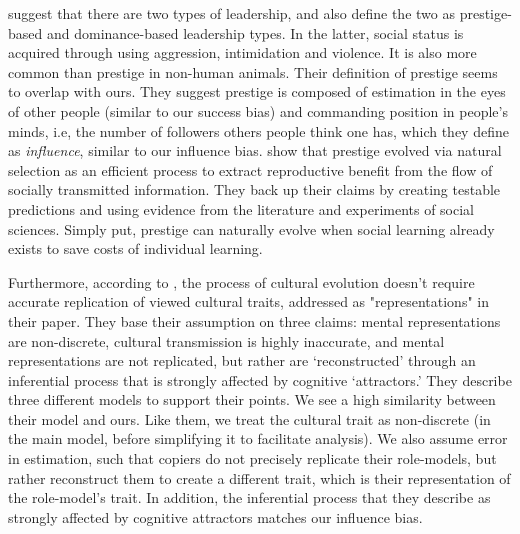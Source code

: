 \documentclass[12pt]{extarticle}
\begin{document}
\citet{prestige_evolution} suggest that there are two types of leadership, and also define the two as prestige-based and dominance-based leadership types.
In the latter, social status is acquired through using aggression, intimidation and violence. It is also more common than prestige in non-human animals.
Their definition of prestige seems to overlap with ours. They suggest prestige is composed of estimation in the eyes of other people (similar to our success bias) and commanding position in people's minds, i.e, the number of followers others people think one has, which they define as \textit{influence}, similar to our influence bias.
\citet{prestige_evolution} show that prestige evolved via natural selection as an efficient process to extract reproductive benefit from the flow of socially transmitted information. They back up their claims by creating testable predictions and using evidence from the literature and experiments of social sciences.
Simply put, prestige can naturally evolve when social learning already exists to save costs of individual learning. 

Furthermore, according to \citet{no_replication}, the process of cultural evolution doesn't require accurate replication of viewed cultural traits, addressed as "representations" in their paper.
They base their assumption on three claims: mental representations are non-discrete, cultural transmission is highly inaccurate, and mental representations are not replicated, but rather are `reconstructed' through an inferential process that is strongly affected by cognitive `attractors.' They describe three different models to support their points.
We see a high similarity between their model and ours. Like them, we treat the cultural trait as non-discrete (in the main model, before simplifying it to facilitate analysis). We also assume error in estimation, such that copiers do not precisely replicate their role-models, but rather reconstruct them to create a different trait, which is their representation of the role-model's trait. In addition, the inferential process that they describe as strongly affected by cognitive attractors matches our influence bias.
\end{document}
